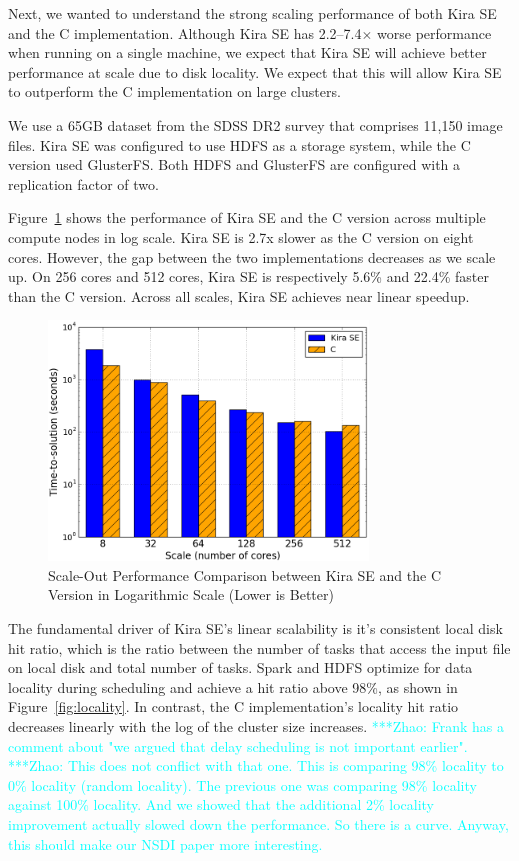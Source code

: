 \documentclass[conference]{IEEEtran}
\newcommand{\zhaonote}[1]{{\textcolor{cyan}    { ***Zhao:      #1 }}}
\newcommand{\zhaonote}[1]{}
\newcommand{\up}{\vspace*{-1em}}
\begin{document}
Next, we wanted to understand the strong scaling performance of both Kira SE and the C
implementation. Although Kira SE has 2.2--7.4$\times$ worse performance when running on
a single machine, we expect that Kira SE will achieve better performance at scale due
to disk locality. We expect that this will allow Kira SE to outperform the C implementation
on large clusters.

We use a 65GB dataset from the SDSS DR2 survey that comprises 11,150 image files.
Kira SE was configured to use HDFS as a storage system, while the C version used GlusterFS. 
Both HDFS and GlusterFS are configured with a replication factor of two.

Figure~\ref{fig:scaleout} shows the performance of Kira SE and the C version across
multiple compute nodes in log scale. Kira SE is 2.7x slower as the C version
on eight cores. However, the gap between the two implementations decreases as we scale up. 
On 256 cores and 512 cores, Kira SE is respectively 5.6\% and 22.4\% faster than the C version.
Across all scales, Kira SE achieves near linear speedup.

\begin{figure}[h]
	\begin{center}
		\includegraphics[width=85mm]{pictures/scaleout}
		\caption{Scale-Out Performance Comparison between Kira SE and the C Version in Logarithmic Scale (Lower is Better)
		\label{fig:scaleout}}
		\up\up
  	\end{center}
\end{figure}

The fundamental driver of Kira SE's linear scalability is it's consistent local disk
hit ratio, which is the ratio between the number of tasks that access the input file 
on local disk and total number of tasks. Spark and HDFS optimize for data locality during scheduling and achieve a
hit ratio above 98\%, as shown in Figure~\ref{fig:locality}. In contrast, the
C implementation's locality hit ratio decreases linearly with the log of the cluster
size increases.
\zhaonote{Frank has a comment about "we argued that delay scheduling is not important earlier".}
\zhaonote{This does not conflict with that one. This is comparing 98\% locality to 0\% locality (random locality).
The previous one was comparing 98\% locality against 100\% locality. And we showed that the additional 2\% 
locality improvement actually slowed down the performance. So there is a curve. Anyway, this should make
our NSDI paper more interesting.}
\end{document}
